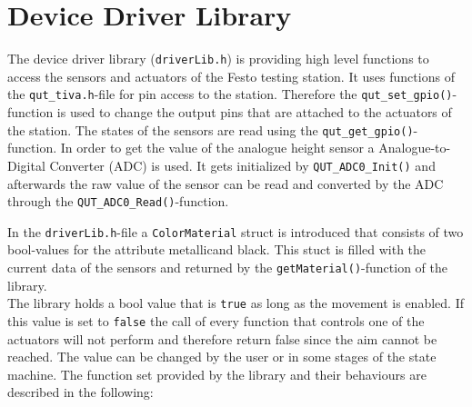 \section{Device Driver Library} %


The device driver library (\texttt{driverLib.h}) is providing high level functions to access the sensors and actuators of the Festo testing station. 
It uses functions of the \texttt{qut\_tiva.h}-file for pin access to the station. 
Therefore the \texttt{qut\_set\_gpio()}-function is used to change the output pins that are attached to the actuators of the station. The states of the sensors are read using the \texttt{qut\_get\_gpio()}-function. In order to get the value of the analogue height sensor a Analogue-to-Digital Converter (ADC) is used. It gets initialized by \texttt{QUT\_ADC0\_Init()} and afterwards the raw value of the sensor can be read and converted by the ADC through the \texttt{QUT\_ADC0\_Read()}-function. 

In the \texttt{driverLib.h}-file a \texttt{ColorMaterial} struct is introduced that consists of two bool-values for the attribute \glq metallic\grq and \glq black\grq. This stuct is filled with the current data of the sensors and returned by the \texttt{getMaterial()}-function of the library.\\

The library holds a bool value that is \texttt{true} as long as the movement is enabled. If this value is set to \texttt{false} the call of every function that controls one of the actuators will not perform and therefore return false since the aim cannot be reached. The value can be changed by the user or in some stages of the state machine. 
The function set provided by the library and their behaviours are described in the following: 

